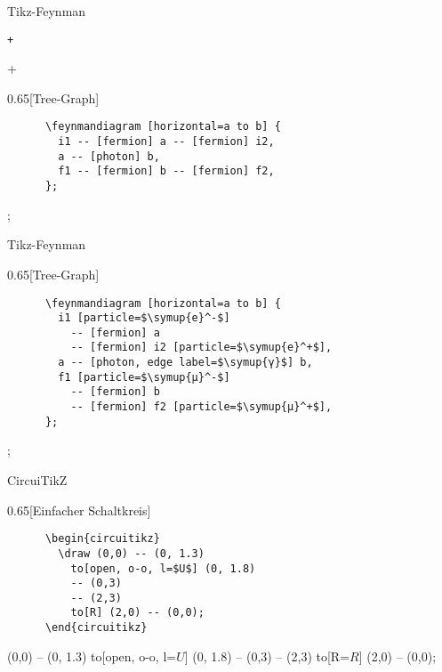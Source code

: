 \begin{frame}[fragile]{Tikz-Feynman}
  \begin{Packages}
    \texttt+\usepackage{tikz-feynman}+
  \end{Packages}
  \begin{CodeExample}{0.65}[Tree-Graph]
    \begin{verbatim}
      \feynmandiagram [horizontal=a to b] {
        i1 -- [fermion] a -- [fermion] i2,
        a -- [photon] b,
        f1 -- [fermion] b -- [fermion] f2,
      };
    \end{verbatim}
  \CodeResult
    ;
  \end{CodeExample}
\end{frame}

\begin{frame}[fragile]{Tikz-Feynman}
  \begin{CodeExample}{0.65}[Tree-Graph]
    \begin{verbatim}
      \feynmandiagram [horizontal=a to b] {
        i1 [particle=$\symup{e}^-$]
          -- [fermion] a
          -- [fermion] i2 [particle=$\symup{e}^+$],
        a -- [photon, edge label=$\symup{γ}$] b,
        f1 [particle=$\symup{μ}^-$]
          -- [fermion] b
          -- [fermion] f2 [particle=$\symup{μ}^+$],
      };
    \end{verbatim}
  \CodeResult
    ;
  \end{CodeExample}
\end{frame}

\begin{frame}[fragile]{CircuiTikZ}
  \begin{CodeExample}{0.65}[Einfacher Schaltkreis]
    \begin{verbatim}
      \begin{circuitikz}
        \draw (0,0) -- (0, 1.3)
          to[open, o-o, l=$U$] (0, 1.8)
          -- (0,3)
          -- (2,3)
          to[R] (2,0) -- (0,0);
      \end{circuitikz}
    \end{verbatim}
  \CodeResult
    \begin{circuitikz}
      \draw (0,0) -- (0, 1.3)
          to[open, o-o, l=$U$] (0, 1.8)
          -- (0,3) -- (2,3)
          to[R=$R$] (2,0) -- (0,0);
      \end{circuitikz}
  \end{CodeExample}
\end{frame}

